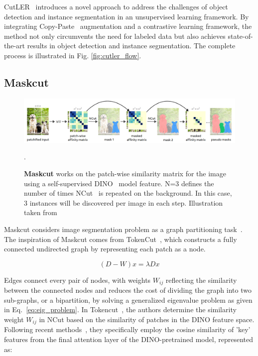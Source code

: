 CutLER~\cite{wang2023cut} introduces a novel approach to address the challenges of object detection and instance segmentation in an unsupervised learning framework. By integrating Copy-Paste~\cite{ghiasi2021simplecopypastestrongdata} augmentation and a contrastive learning framework, the method not only circumvents the need for labeled data but also achieves state-of-the-art results in object detection and instance segmentation. The complete process is illustrated in Fig. \ref{fig:cutler_flow}.
 
\subsection{Maskcut}
\begin{figure}
	\centering
	\includegraphics[width=1.0\textwidth]{Images/main/maskcut_eg.png}
	\caption[\textbf{Maskcut flow}]{\textbf{Maskcut} works on the patch-wise
		similarity matrix for the image using a self-supervised DINO~\cite{caron2021emerging} model feature. N=3 defines the number of times NCut~\cite{normcut} is repeated on the background. In this case, 3 instances will be discovered per image in each step. Illustration taken from~\cite{wang2023cut}}.
	\label{fig:maskcut_flow}
\end{figure}
Maskcut considers image segmentation problem as a graph partitioning task~\cite{normcut}. The inspiration of Maskcut comes from TokenCut~\cite{wang2022tokencut}, which constructs a fully connected undirected graph by representing each patch as a node. 

\begin{equation}
	\label{eq:eig_problem}
	(D - W)x = \lambda Dx
\end{equation}

Edges connect every pair of nodes, with weights \(W_{ij}\) reflecting the similarity between the connected nodes and reduces the cost of dividing the graph into two sub-graphs, or a bipartition, by solving a generalized eigenvalue problem as given in Eq.~\ref{eq:eig_problem}. In Tokencut~\cite{wang2022tokencut}, the authors determine the similarity weight \( W_{ij} \) in NCut based on the similarity of patches in the DINO feature space. Following recent methods~\cite{simeoni2021localizingobjectsselfsupervisedtransformers, vangansbeke2022discoveringobjectmaskstransformers, wang2023tokencutsegmentingobjectsimages}, they specifically employ the cosine similarity of 'key' features from the final attention layer of the DINO-pretrained model, represented as:


